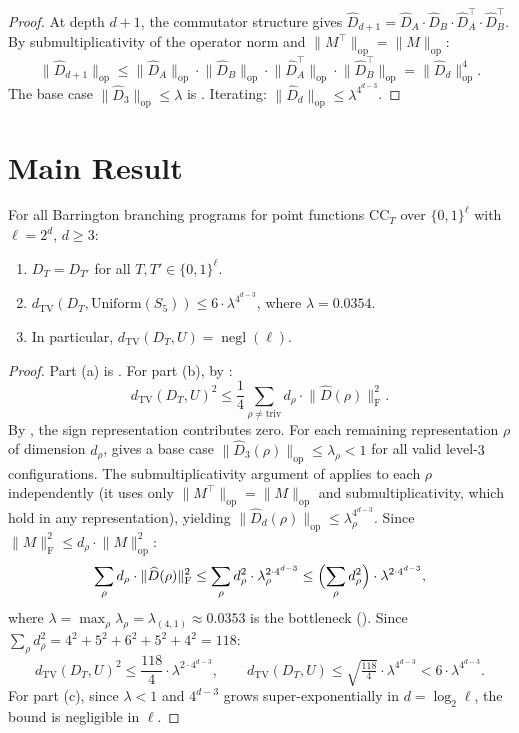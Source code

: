 \documentclass[version=submission]{iacrcc}
\DeclareMathOperator{\negl}{negl}
\newcommand{\norm}[1]{\lVert #1 \rVert}
\newcommand{\frob}[1]{\norm{#1}_{\mathrm{F}}}
\newcommand{\opn}[1]{\norm{#1}_{\mathrm{op}}}
\newcommand{\dtv}{d_{\mathrm{TV}}}
\newcommand{\Dhat}{\widehat{D}}
\newcommand{\CC}{\mathrm{CC}}
\begin{document}
\begin{proof}
At depth $d+1$, the commutator structure gives
$\Dhat_{d+1} = \Dhat_A \cdot \Dhat_B \cdot \Dhat_A^\top \cdot \Dhat_B^\top$.
By submultiplicativity of the operator norm and $\opn{M^\top} = \opn{M}$:
\[
\opn{\Dhat_{d+1}} \leq \opn{\Dhat_A} \cdot \opn{\Dhat_B} \cdot
\opn{\Dhat_A^\top} \cdot \opn{\Dhat_B^\top} = \opn{\Dhat_d}^4.
\]
The base case $\opn{\Dhat_3} \leq \lambda$ is .
Iterating: $\opn{\Dhat_d} \leq \lambda^{4^{d-3}}$.
\end{proof}


\section{Main Result}
\label{sec:main}

\begin{theorem}
\label{thm:main}
For all Barrington branching programs for point functions $\CC_T$ over
$\{0,1\}^\ell$ with $\ell = 2^d$, $d \geq 3$:
\begin{enumerate}[label=(\alph*),nosep]
\item $D_T = D_{T'}$ for all $T, T' \in \{0,1\}^\ell$.
\item $\dtv(D_T, \mathrm{Uniform}(S_5)) \leq 6 \cdot \lambda^{4^{d-3}}$,
  where $\lambda = 0.0354$.
\item In particular, $\dtv(D_T, U) = \negl(\ell)$.
\end{enumerate}
\end{theorem}

\begin{proof}
Part (a) is . For part (b), by :
\[
\dtv(D_T, U)^2 \leq \frac{1}{4} \sum_{\rho \neq \mathrm{triv}} d_\rho \cdot
\frob{\Dhat(\rho)}^2.
\]
By , the sign representation contributes zero.
For each remaining representation $\rho$ of dimension $d_\rho$,
 gives a base case
$\opn{\Dhat_3(\rho)} \leq \lambda_\rho < 1$ for all valid level-$3$
configurations. The submultiplicativity argument of 
applies to each $\rho$ independently (it uses only $\opn{M^\top} = \opn{M}$
and submultiplicativity, which hold in any representation), yielding
$\opn{\Dhat_d(\rho)} \leq \lambda_\rho^{4^{d-3}}$.
Since $\frob{M}^2 \leq d_\rho \cdot \opn{M}^2$:
\[
\sum_{\rho} d_\rho \cdot \frob{\Dhat(\rho)}^2
\leq \sum_{\rho} d_\rho^2 \cdot \lambda_\rho^{2 \cdot 4^{d-3}}
\leq \Bigl(\sum_{\rho} d_\rho^2\Bigr) \cdot \lambda^{2 \cdot 4^{d-3}},
\]
where $\lambda = \max_\rho \lambda_\rho = \lambda_{(4,1)} \approx 0.0353$
is the bottleneck (). Since
$\sum_\rho d_\rho^2 = 4^2 + 5^2 + 6^2 + 5^2 + 4^2 = 118$:
\[
\dtv(D_T, U)^2 \leq \frac{118}{4} \cdot \lambda^{2 \cdot 4^{d-3}},
\qquad
\dtv(D_T, U) \leq \sqrt{\tfrac{118}{4}} \cdot \lambda^{4^{d-3}}
< 6 \cdot \lambda^{4^{d-3}}.
\]
For part (c), since $\lambda < 1$ and $4^{d-3}$ grows super-exponentially in
$d = \log_2 \ell$, the bound is negligible in $\ell$.
\end{proof}
\end{document}
